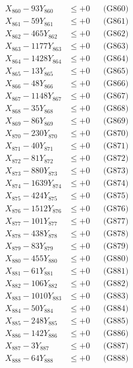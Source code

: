 \documentclass[a4paper,10pt]{article}
\begin{document}
{\begin{align}
X_{860} - 93Y_{860} &\leq +0 && \text{(G860)} \\
\allowbreak
X_{861} - 59Y_{861} &\leq +0 && \text{(G861)} \\
X_{862} - 465Y_{862} &\leq +0 && \text{(G862)} \\
X_{863} - 1177Y_{863} &\leq +0 && \text{(G863)} \\
X_{864} - 1428Y_{864} &\leq +0 && \text{(G864)} \\
X_{865} - 13Y_{865} &\leq +0 && \text{(G865)} \\
X_{866} - 48Y_{866} &\leq +0 && \text{(G866)} \\
X_{867} - 1148Y_{867} &\leq +0 && \text{(G867)} \\
X_{868} - 35Y_{868} &\leq +0 && \text{(G868)} \\
X_{869} - 86Y_{869} &\leq +0 && \text{(G869)} \\
X_{870} - 230Y_{870} &\leq +0 && \text{(G870)} \\
\allowbreak
X_{871} - 40Y_{871} &\leq +0 && \text{(G871)} \\
X_{872} - 81Y_{872} &\leq +0 && \text{(G872)} \\
X_{873} - 880Y_{873} &\leq +0 && \text{(G873)} \\
X_{874} - 1639Y_{874} &\leq +0 && \text{(G874)} \\
X_{875} - 424Y_{875} &\leq +0 && \text{(G875)} \\
X_{876} - 1512Y_{876} &\leq +0 && \text{(G876)} \\
X_{877} - 101Y_{877} &\leq +0 && \text{(G877)} \\
X_{878} - 438Y_{878} &\leq +0 && \text{(G878)} \\
X_{879} - 83Y_{879} &\leq +0 && \text{(G879)} \\
X_{880} - 455Y_{880} &\leq +0 && \text{(G880)} \\
\allowbreak
X_{881} - 61Y_{881} &\leq +0 && \text{(G881)} \\
X_{882} - 106Y_{882} &\leq +0 && \text{(G882)} \\
X_{883} - 1010Y_{883} &\leq +0 && \text{(G883)} \\
X_{884} - 50Y_{884} &\leq +0 && \text{(G884)} \\
X_{885} - 248Y_{885} &\leq +0 && \text{(G885)} \\
X_{886} - 142Y_{886} &\leq +0 && \text{(G886)} \\
X_{887} - 3Y_{887} &\leq +0 && \text{(G887)} \\
X_{888} - 64Y_{888} &\leq +0 && \text{(G888)} \\

\end{align}}
\end{document}
